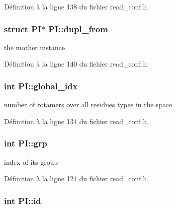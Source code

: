 Définition à la ligne 138 du fichier read\+\_\+conf.\+h.

\hypertarget{struct_p_i_aee5b9d9ac837b1564d456d8966c9bf47}{
\subsubsection[{dupl\+\_\+from}]{\setlength{\rightskip}{0pt plus 5cm}struct {\bf P\+I}$\ast$ P\+I\+::dupl\+\_\+from}}\label{struct_p_i_aee5b9d9ac837b1564d456d8966c9bf47}


the mother instance 



Définition à la ligne 140 du fichier read\+\_\+conf.\+h.

\hypertarget{struct_p_i_aa6edf4498113227513f9d2aed0c493c4}{
\subsubsection[{global\+\_\+idx}]{\setlength{\rightskip}{0pt plus 5cm}int P\+I\+::global\+\_\+idx}}\label{struct_p_i_aa6edf4498113227513f9d2aed0c493c4}


number of rotamers over all residues types in the space 



Définition à la ligne 134 du fichier read\+\_\+conf.\+h.

\hypertarget{struct_p_i_afd1d054c2fea5717dada3b2560b65018}{
\subsubsection[{grp}]{\setlength{\rightskip}{0pt plus 5cm}int P\+I\+::grp}}\label{struct_p_i_afd1d054c2fea5717dada3b2560b65018}


index of its group 



Définition à la ligne 124 du fichier read\+\_\+conf.\+h.

\hypertarget{struct_p_i_aeacab9a46c42d74eca7e1c74e56b8e8a}{
\subsubsection[{id}]{\setlength{\rightskip}{0pt plus 5cm}int P\+I\+::id}}\label{struct_p_i_aeacab9a46c42d74eca7e1c74e56b8e8a}


